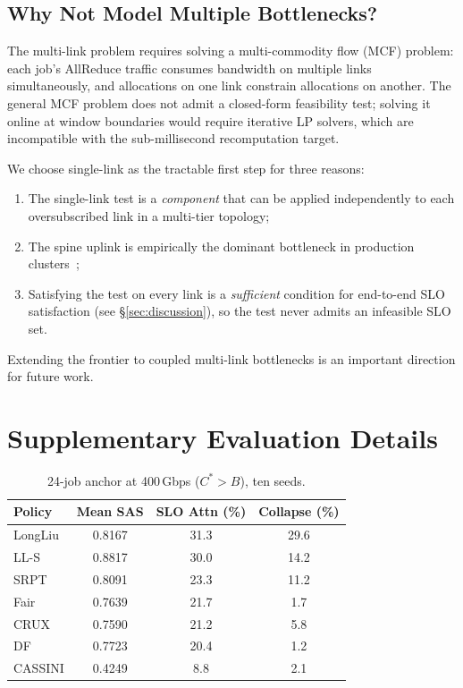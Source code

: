 \subsection{Why Not Model Multiple Bottlenecks?}

The multi-link problem requires solving a multi-commodity flow (MCF) problem: each job's AllReduce traffic consumes bandwidth on multiple links simultaneously, and allocations on one link constrain allocations on another. The general MCF problem does not admit a closed-form feasibility test; solving it online at window boundaries would require iterative LP solvers, which are incompatible with the sub-millisecond recomputation target.

We choose single-link as the tractable first step for three reasons:
\begin{enumerate}
\item The single-link test is a \emph{component} that can be applied independently to each oversubscribed link in a multi-tier topology;
\item The spine uplink is empirically the dominant bottleneck in production clusters~\cite{Philly};
\item Satisfying the test on every link is a \emph{sufficient} condition for end-to-end SLO satisfaction (see \S\ref{sec:discussion}), so the test never admits an infeasible SLO set.
\end{enumerate}
Extending the frontier to coupled multi-link bottlenecks is an important direction for future work.

\section{Supplementary Evaluation Details}
\label{sec:app-supp}

\begin{table}[h]
\centering
\caption{24-job anchor at 400\,Gbps ($C^*>B$), ten seeds.}
\label{tab:anchor}
\footnotesize\begin{tabular}{lccc}\toprule
Policy & Mean SAS & SLO Attn (\%) & Collapse (\%) \\
\midrule
LongLiu & 0.8167 & 31.3 & 29.6 \\
LL-S & 0.8817 & 30.0 & 14.2 \\
SRPT & 0.8091 & 23.3 & 11.2 \\
Fair & 0.7639 & 21.7 & 1.7 \\
CRUX & 0.7590 & 21.2 & 5.8 \\
DF & 0.7723 & 20.4 & 1.2 \\
CASSINI & 0.4249 & 8.8 & 2.1 \\
\bottomrule\end{tabular}\end{table}


